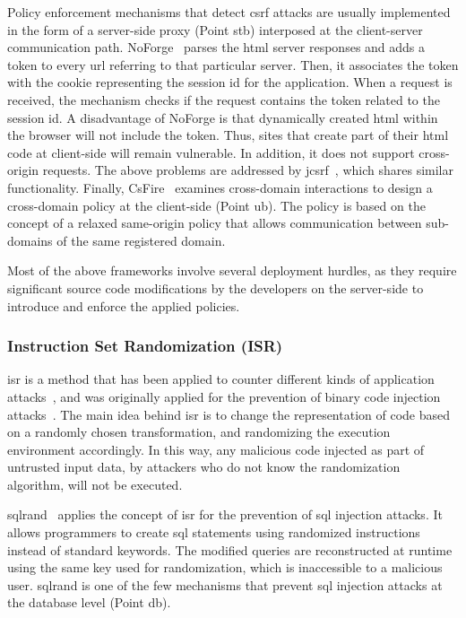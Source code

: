 \documentclass[10pt,journal,compsoc]{IEEEtran}
\begin{document}
Policy enforcement mechanisms that detect {\sc csrf}
attacks are usually implemented in the form of a
server-side proxy (Point {\sc s}t{\sc b})
interposed at the client-server communication path.
NoForge~\cite{JKK06a}
parses the {\sc html} server responses
and adds a token to every {\sc url} referring to that particular
server. Then, it associates the token with the cookie
representing the session {\sc id} for the application.
When a request is received, the mechanism checks
if the request contains the token related
to the session {\sc id}. A disadvantage of NoForge
is that  dynamically created {\sc html} within
the browser will not include the token.
Thus, sites that create part of their {\sc html} code at client-side
will remain vulnerable. In addition, it does not
support cross-origin requests.
The above problems are addressed by j{\sc csrf}~\cite{PS11},
which shares similar functionality.
Finally, CsFire~\cite{DDHPJ10}
examines cross-domain interactions to design a
cross-domain policy at the client-side (Point {\sc ub}).
The policy is based on the concept of a relaxed
same-origin policy that allows communication between
sub-domains of the same registered domain.

Most of the above frameworks involve
several deployment hurdles, as they
require significant source code modifications by the
developers on the server-side to introduce and enforce
the applied policies.

\subsubsection{Instruction Set Randomization (ISR)}

{\sc isr} is a method that has been applied to counter different kinds
of application attacks~\cite{K09b}, and was originally applied for the
prevention of binary code injection attacks~\cite{KKP03}.
The main idea behind {\sc isr} is
to change the representation of code
based on a randomly chosen transformation,
and randomizing the execution environment accordingly.
In this way, any malicious code injected as part of untrusted input data,
by attackers who do not know the randomization algorithm,
will not be executed.

{\sc sql}rand~\cite{BK04} applies the concept of {\sc isr} for the prevention
of {\sc sql} injection attacks. It allows programmers to create {\sc sql}
statements using randomized instructions instead of standard keywords.
The modified queries are reconstructed at runtime using the same key
used for randomization, which is inaccessible to a malicious user.
{\sc sql}rand is one of the few mechanisms that prevent {\sc sql}
injection attacks at the database level (Point {\sc db}).
\end{document}
